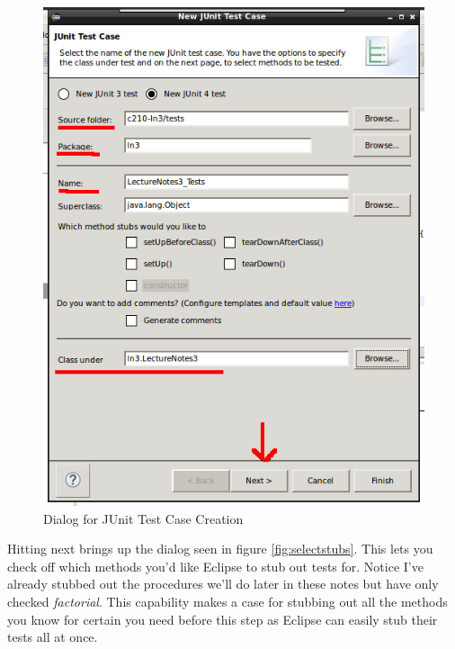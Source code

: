 \documentclass[]{tufte-handout}
\begin{document}
\vspace{.1in}
\begin{center}
\begin{figure}[!htb]
\includegraphics[scale=.5]{Eclipse-NewJUnitCase.png}
\caption{Dialog for JUnit Test Case Creation} 
\label{fig:newtest}
\end{figure}
\end{center}
\vspace{.1in}

Hitting next brings up the dialog seen in figure \ref{fig:selectstubs}. This lets you check off which methods you'd like Eclipse to stub out tests for. Notice I've already stubbed out the procedures we'll do later in these notes but have only checked \textit{factorial}. This capability makes a case for stubbing out all the methods you know for certain you need before this step as Eclipse can easily stub their tests all at once. 
\end{document}

